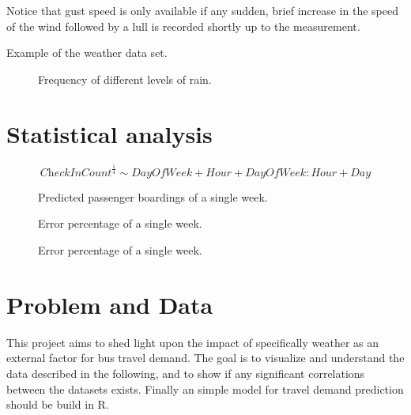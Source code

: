 \documentclass[a4paper,11pt]{article}
\begin{document}
Notice that gust speed is only available if any sudden, brief increase in the speed of the wind followed by a lull is recorded shortly up to the measurement.
 
\begin{table}[!ht]
    \center
    \resizebox{\linewidth}{!}{
    
    }
    \caption{Example of the weather data set.}
    \label{tab:weather_data_example}
\end{table}


\begin{figure}[!ht]
    \center
    
    \caption{Frequency of different levels of rain.}
    \label{fig:weather_hist}
\end{figure}

\clearpage

\section{Statistical analysis}

$$
\textit{CheckInCount}^{\frac{1}{4}} \sim \textit{DayOfWeek} + \textit{Hour} + \textit{DayOfWeek}:\textit{Hour} + \textit{Day}
$$

\begin{figure}[!ht]
    \center
    
    \caption{Predicted passenger boardings of a single week.}
    \label{fig:travelcard_pred}
\end{figure}

\clearpage

\begin{figure}[!ht]
    \center
    
    \caption{Error percentage of a single week.}
    \label{fig:travelcard_error_pct}
\end{figure}

\begin{figure}[!ht]
    \center
    
    \caption{Error percentage of a single week.}
    \label{fig:weather_rain}
\end{figure}


\clearpage

\section{Problem and Data}\label{ch:data_old}
This project aims to shed light upon the impact of specifically weather as an external factor for bus travel demand. The goal is to visualize and understand the data described in the following, and to show if any significant correlations between the datasets exists. Finally an simple model for travel demand prediction should be build in R.
\end{document}
